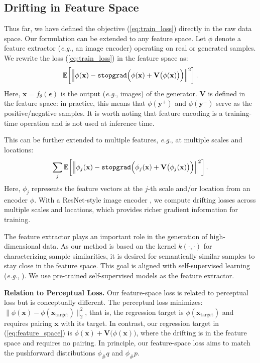 \documentclass{article}
\newcommand{\vv}[1]{\mathbf{#1}}
\newcommand{\x}{\vv{x}}
\newcommand{\y}{\vv{y}}
\newcommand{\V}{\vv{V}}
\newcommand{\e}{{\boldsymbol{\epsilon}}}
\renewcommand{\paragraph}[1]{\vspace{.05em}\noindent\textbf{#1}}
\def\onedot{.}
\def\eg{\emph{e.g}\onedot} \def\Eg{\emph{E.g}\onedot}
\theoremstyle{plain}
\theoremstyle{definition}
\theoremstyle{remark}
\begin{document}
\subsection{Drifting in Feature Space}
\label{subsec:feature_space}

Thus far, we have defined the objective (\ref{eq:train_loss}) directly in the raw data space. Our formulation can be extended to any feature space.
Let $\phi$ denote a feature extractor (\eg, an image encoder) operating on real or generated samples. We rewrite the loss (\ref{eq:train_loss}) in the feature space as:
\begin{equation}
\mathbb{E}\!\left[
\left\|
\phi(\x)
-
\text{\texttt{stopgrad}}\Big(
\phi(\x)
+
\V\big(\phi(\x)\big)
\Big)
\right\|^2
\right].
\label{eq:feature_space}
\end{equation}
Here, $\x=f_\theta(\e)$ is the output (\eg, images) of the generator. $\V$ is defined in the feature space: in practice, this means that
$\phi(\y^+)$ and $\phi(\y^-)$ serve as the positive/negative samples.
It is worth noting that feature encoding is a training-time operation and is not used at inference time.


This can be further extended to multiple features, \eg, at multiple scales and locations:
\begin{equation}
\sum_j\mathbb{E}\!\left[
\left\|
\phi_j(\x)
-
\text{\texttt{stopgrad}}\Big(
\phi_j(\x)
+
\V\big(\phi_j(\x)\big)
\Big)
\right\|^2
\right].
\label{eq:feature_space_multi}
\end{equation}
Here, $\phi_j$ represents the feature vectors at the $j$-th scale and/or location from an encoder $\phi$.
With a ResNet-style image encoder \cite{he2016deep}, we compute drifting losses across multiple scales and locations, which provides richer gradient information for training.


The feature extractor plays an important role in the generation of high-dimensional data.
As our method is based on the kernel $k(\cdot, \cdot)$ for characterizing sample similarities, it is desired for semantically similar samples to stay close in the feature space. This goal is aligned with self-supervised learning (\eg, \citealt{he2020momentum,chen2020simple}).
We use pre-trained self-supervised models as the feature extractor.

\paragraph{Relation to Perceptual Loss.}
Our feature-space loss is related to perceptual loss \cite{zhang2018unreasonable} but is conceptually different. The perceptual loss minimizes: $\|\phi(\x)-\phi(\x_\text{target})\|_2^2$, that is, the regression target is $\phi(\x_\text{target})$ and requires pairing $\x$ with its target.
In contrast, our regression target in (\ref{eq:feature_space}) is
$
\phi(\x)
+
\V\big(\phi(\x)\big)
$, where the drifting is in the feature space and requires no pairing.
In principle, our feature-space loss aims to match the pushforward distributions $\phi_\#q$ and $\phi_\#p$.
\end{document}
